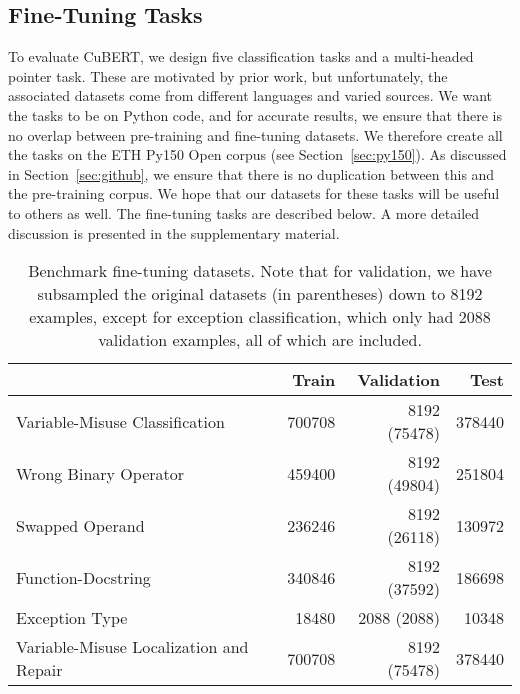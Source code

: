 \documentclass{article}
\newcommand{\BERTforCode}{CuBERT\xspace}
\newcommand{\update}[1]{#1}
\begin{document}
\subsection{Fine-Tuning Tasks}
\label{sec:fine-tuningTasks}

To evaluate \BERTforCode, we design five {classification tasks and a multi-headed pointer task}. These are motivated by prior work, but unfortunately, the associated datasets come from different languages and varied sources. We want the tasks to be on Python code, and for accurate results, we ensure that there is no overlap between pre-training and fine-tuning datasets. We therefore create all the tasks on the ETH Py150 Open corpus (see Section~\ref{sec:py150}). As discussed in Section~\ref{sec:github}, we ensure that there is no duplication between this and the pre-training corpus. We hope that our datasets for these tasks will be useful to others as well. The fine-tuning tasks are described below. \update{A more detailed discussion is presented in the supplementary material.}

\begin{table*}[t]
\centering
\begin{tabular}{lrrr}
\toprule
          & Train & Validation & Test \\ \midrule
 Variable-Misuse Classification & \num{700708} & \num{8192} \;(\num{75478}) & \num{378440} \\
 Wrong Binary Operator & \num{459400} & \num{8192} \;(\num{49804}) & \num{251804} \\
 Swapped Operand & \num{236246} & \num{8192} \;(\num{26118}) & \num{130972} \\
 Function-Docstring & \num{340846} & \num{8192} \;(\num{37592}) & \num{186698} \\
 Exception Type & \num{18480} & \num{2088}\phantom{0} \;(\num{2088}) & \num{10348}\\
 Variable-Misuse Localization and Repair  & \num{700708} & \num{8192} \;(\num{75478}) & \num{378440} \\
\bottomrule
\end{tabular}
\caption{\label{tab:BenchmarkDatasets} \update{Benchmark fine-tuning datasets. Note that for validation, we have subsampled the original datasets (in parentheses) down to \num{8192} examples, except for exception classification, which only had \num{2088} validation examples, all of which are included.}}
\label{tab:datasets}
\end{table*}
\end{document}
